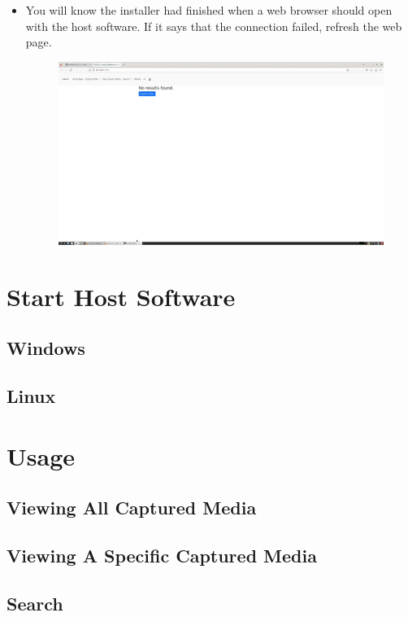\documentclass[12pt]{article}
\begin{document}
\begin{center}
\begin{itemize}
\begin{figure}[H]
		      \end{figure}
		\item You will know the installer had finished when a web browser should open with the host software. If it says that the connection failed, refresh the web page.
		      \begin{figure}[H]
			      \includegraphics[width=\textwidth]{Figures/Linux-Host-Software-Install-Finish.png}
		      \end{figure}


	\end{itemize}
	\section{Start Host Software}
	\subsection{Windows}
	\subsection{Linux}
	\section{Usage}
	\subsection{Viewing All Captured Media}
	\subsection{Viewing A Specific Captured Media}
	\subsection{Search}

\end{center}
\end{document}
